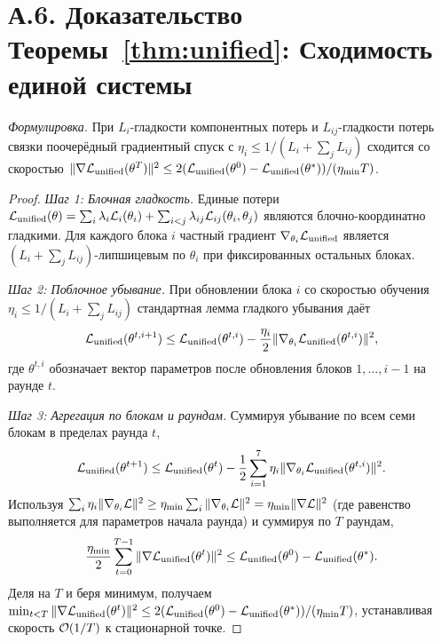 \section*{А.6. Доказательство Теоремы~\ref{thm:unified}: Сходимость единой системы}
\label{app:proof_unified}

\noindent\textit{Формулировка.} При $L_i$-гладкости компонентных потерь и $L_{ij}$-гладкости потерь связки поочерёдный градиентный спуск с $\eta_i\le 1/(L_i+\sum_j L_{ij})$ сходится со скоростью $\|\nabla\mathcal{L}_{\mathrm{unified}}(\theta^T)\|^2\le 2(\mathcal{L}_{\mathrm{unified}}(\theta^0)-\mathcal{L}_{\mathrm{unified}}(\theta^*))/(\eta_{\min}T)$.

\begin{proof}
\textit{Шаг 1: Блочная гладкость.} Единые потери $\mathcal{L}_{\mathrm{unified}}(\theta) = \sum_i\lambda_i\mathcal{L}_i(\theta_i) + \sum_{i<j}\lambda_{ij}\mathcal{L}_{ij}(\theta_i,\theta_j)$ являются блочно-координатно гладкими. Для каждого блока $i$ частный градиент $\nabla_{\theta_i}\mathcal{L}_{\mathrm{unified}}$ является $(L_i+\sum_j L_{ij})$-липшицевым по $\theta_i$ при фиксированных остальных блоках.

\textit{Шаг 2: Поблочное убывание.} При обновлении блока $i$ со скоростью обучения $\eta_i\le 1/(L_i+\sum_j L_{ij})$ стандартная лемма гладкого убывания даёт
\begin{equation}
\mathcal{L}_{\mathrm{unified}}(\theta^{t,i+1}) \le \mathcal{L}_{\mathrm{unified}}(\theta^{t,i}) - \frac{\eta_i}{2}\|\nabla_{\theta_i}\mathcal{L}_{\mathrm{unified}}(\theta^{t,i})\|^2,
\end{equation}
где $\theta^{t,i}$ обозначает вектор параметров после обновления блоков $1,\ldots,i{-}1$ на раунде $t$.

\textit{Шаг 3: Агрегация по блокам и раундам.} Суммируя убывание по всем семи блокам в пределах раунда $t$,
\begin{equation}
\mathcal{L}_{\mathrm{unified}}(\theta^{t+1}) \le \mathcal{L}_{\mathrm{unified}}(\theta^{t}) - \frac{1}{2}\sum_{i=1}^7\eta_i\|\nabla_{\theta_i}\mathcal{L}_{\mathrm{unified}}(\theta^{t,i})\|^2.
\end{equation}
Используя $\sum_i\eta_i\|\nabla_{\theta_i}\mathcal{L}\|^2\ge\eta_{\min}\sum_i\|\nabla_{\theta_i}\mathcal{L}\|^2 = \eta_{\min}\|\nabla\mathcal{L}\|^2$ (где равенство выполняется для параметров начала раунда) и суммируя по $T$ раундам,
\begin{equation}
\frac{\eta_{\min}}{2}\sum_{t=0}^{T-1}\|\nabla\mathcal{L}_{\mathrm{unified}}(\theta^t)\|^2
\le \mathcal{L}_{\mathrm{unified}}(\theta^0) - \mathcal{L}_{\mathrm{unified}}(\theta^*).
\end{equation}
Деля на $T$ и беря минимум, получаем $\min_{t<T}\|\nabla\mathcal{L}_{\mathrm{unified}}(\theta^t)\|^2\le 2(\mathcal{L}_{\mathrm{unified}}(\theta^0)-\mathcal{L}_{\mathrm{unified}}(\theta^*))/(\eta_{\min}T)$, устанавливая скорость $\mathcal{O}(1/T)$ к стационарной точке.
\end{proof}



